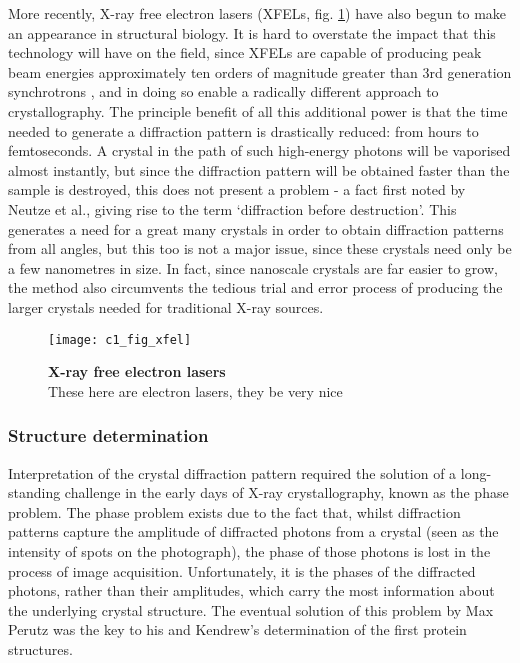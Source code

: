 \documentclass[a4paper,11pt,twoside,openright]{scrbook}
\begin{document}
More recently, X-ray free electron lasers (XFELs, fig. \ref{c1fig1}) have also begun to make an appearance in structural biology. It is hard to overstate the impact that this technology will have on the field, since XFELs are capable of producing peak beam energies approximately ten orders of magnitude greater than 3rd generation synchrotrons \cite{Shi2014}, and in doing so enable a radically different approach to crystallography. The principle benefit of all this additional power is that the time needed to generate a diffraction pattern is drastically reduced: from hours to femtoseconds. A crystal in the path of such high-energy photons will be vaporised almost instantly, but since the diffraction pattern will be obtained faster than the sample is destroyed, this does not present a problem - a fact first noted by Neutze et al.\cite{Neutze2000}, giving rise to the term `diffraction before destruction'. This generates a need for a great many crystals in order to obtain diffraction patterns from all angles, but this too is not a major issue, since these crystals need only be a few nanometres in size. In fact, since nanoscale crystals are far easier to grow, the method also circumvents the tedious trial and error process of producing the larger crystals needed for traditional X-ray sources.

\begin{figure}[h]
    \texttt{[image: c1\_fig\_xfel]}
    \caption[X-ray free electron lasers]{\sffamily \textbf{X-ray free electron lasers} \\ \rmfamily These here are electron lasers, they be very nice}
    \label{c1fig1}
\end{figure}

\subsubsection{Structure determination}
Interpretation of the crystal diffraction pattern required the solution of a long-standing challenge in the early days of X-ray crystallography, known as the phase problem. The phase problem exists due to the fact that, whilst diffraction patterns capture the amplitude of diffracted photons from a crystal (seen as the intensity of spots on the photograph), the phase of those photons is lost in the process of image acquisition. Unfortunately, it is the phases of the diffracted photons, rather than their amplitudes, which carry the most information about the underlying crystal structure. The eventual solution of this problem by Max Perutz was the key to his and Kendrew's determination of the first protein structures.
\end{document}
